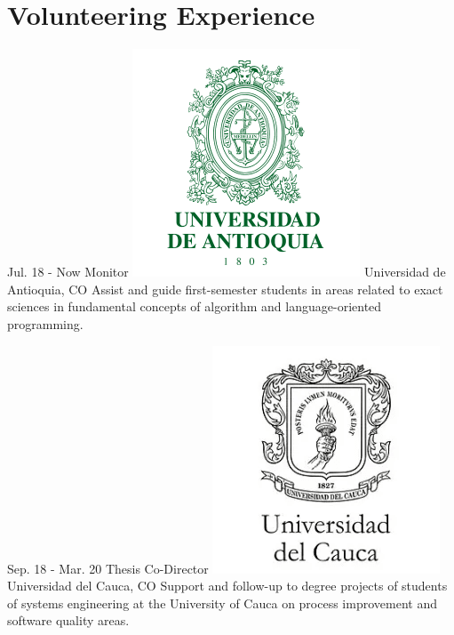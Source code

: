 \documentclass[american]{cv-class}
\begin{document}
\newpage

\section{Volunteering Experience}
\begin{entrylist}
	  
	\entry
	{Jul. 18 - Now}
	{Monitor}
	{{\includegraphics[scale=0.05]{img/udea-logo.png}} Universidad de Antioquia, CO} 
	{Assist and guide first-semester students in areas related to exact sciences in fundamental concepts of algorithm and language-oriented programming.}
	  
	\entry
	{Sep. 18 - Mar. 20}
	{Thesis Co-Director}
	{{\includegraphics[scale=0.05]{img/unicauca-logo.png}} Universidad del Cauca, CO} 
	{Support and follow-up to degree projects of students of systems engineering at the University of Cauca on process improvement and software quality areas.}
	

\end{entrylist}
\end{document}

